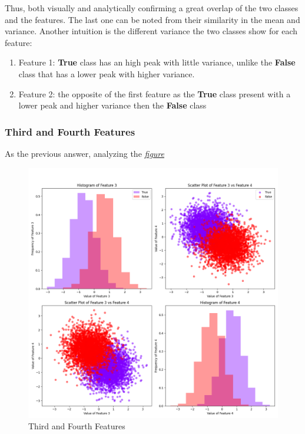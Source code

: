 \documentclass[a4paper, 12pt, english]{article}
\begin{document}
    Thus, both visually and analytically confirming a great overlap of the two classes and the features. The last one can be noted from their similarity in the mean and variance.
    Another intuition is the different variance the two classes show for each feature:
    \begin{enumerate}
        \item Feature 1: \textbf{True} class has an high peak with little variance, unlike the \textbf{False} class that has a lower peak with higher variance.
        \item Feature 2: the opposite of the first feature as the \textbf{True} class present with a lower peak and higher variance then the \textbf{False} class

    \end{enumerate}

    \subsubsection{Third and Fourth Features}
    \label{project1:2}
    As the previous answer, analyzing the \hyperref[fig:project1_3-4]{\textit{figure}}

    \begin{figure}[h]
        \centering
        \includegraphics[width=0.7\linewidth]{img/projects/project1/3-4.png}
        \caption{Third and Fourth Features}
        \label{fig:project1_3-4}
    \end{figure}
\end{document}
